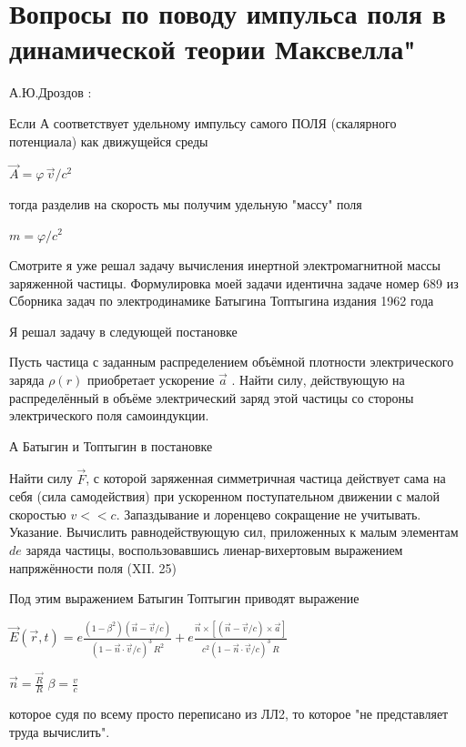 \documentclass{article}
\begin{document}

\section{Вопросы по поводу импульса поля в динамической теории Максвелла"}
А.Ю.Дроздов :

 Если А соответствует удельному импульсу самого ПОЛЯ (скалярного потенциала) как движущейся среды

$\vec{A} = \varphi\,\vec{v}/c^2$

тогда разделив на скорость мы получим удельную "массу" поля

$m = \varphi/c^2$

Смотрите я уже решал задачу вычисления инертной электромагнитной массы заряженной частицы. Формулировка моей задачи идентична задаче номер 689 из Сборника задач по электродинамике Батыгина Топтыгина издания 1962 года

Я решал задачу в следующей постановке

Пусть частица с заданным распределением объёмной плотности электрического заряда $\rho \left( r \right)$ приобретает ускорение $\overrightarrow{a}$ . Найти силу, действующую на распределённый в объёме электрический заряд этой частицы со стороны электрического поля самоиндукции.

А Батыгин и Топтыгин в постановке

Найти силу $\vec{F}$, с которой заряженная симметричная частица действует сама на себя (сила самодействия) при ускоренном поступательном движении с малой скоростью $v << c$. Запаздывание и лоренцево сокращение не учитывать.
Указание. Вычислить равнодействующую сил, приложенных к малым элементам $de$ заряда частицы, воспользовавшись лиенар-вихертовым выражением напряжённости поля (XII. 25)

Под этим выражением Батыгин Топтыгин приводят выражение

$\vec{E}\left(\vec{r},t\right) = e \frac{\left(1-\beta^2\right) \left(\vec{n}-\vec{v}/c \right)}{\left(1-\vec{n}\cdot\vec{v}/c\right)^3\,R^2} + e \frac{ \vec{n} \times \left[ \left( \vec{n}-\vec{v}/c\right) \times \vec{a}\right]}{c^2 \left(1-\vec{n} \cdot \vec{v}/c \right)^3 \,R }$

$\vec{n}=\frac{\vec{R}}{R}$ $\beta=\frac{v}{c}$

которое судя по всему  просто переписано из ЛЛ2, то которое "не представляет труда вычислить".
\end{document}
